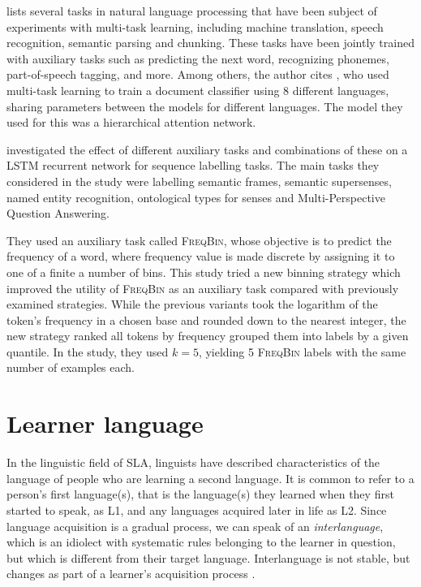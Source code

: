 \textcite{ruder17} lists several tasks in natural language processing that
have been subject of experiments with multi-task learning, including machine
translation, speech recognition, semantic parsing and chunking. These tasks
have been jointly trained with auxiliary tasks such as predicting the next
word, recognizing phonemes, part-of-speech tagging, and more. Among others,
the author cites \textcite{pappas17}, who used multi-task learning to train a
document classifier using 8 different languages, sharing parameters between
the models for different languages. The model they used for this was a
hierarchical attention network.

\textcite{alonso17} investigated the effect of different auxiliary tasks and
combinations of these on a \ac{LSTM} recurrent network for sequence labelling
tasks. The main tasks they considered in the study were labelling semantic
frames, semantic supersenses, named entity recognition, ontological types for
senses and Multi-Perspective Question Answering.

They used an auxiliary task called \textsc{FreqBin}, whose objective is to
predict the frequency of a word, where frequency value is made discrete by
assigning it to one of a finite a number of bins. This study tried a new
binning strategy which improved the utility of \textsc{FreqBin} as an
auxiliary task compared with previously examined strategies. While the
previous variants took the logarithm of the token's frequency in a chosen
base and rounded down to the nearest integer, the new strategy ranked all
tokens by frequency grouped them into labels by a given quantile. In the
study, they used $k=5$, yielding 5 \textsc{FreqBin} labels with the same
number of examples each.


\section{Learner language}

In the linguistic field of \ac{SLA}, linguists have described characteristics
of the language of people who are learning a second language. It is common to
refer to a person's first language(s), that is the language(s) they learned
when they first started to speak, as L1, and any languages acquired later in
life as L2. Since language acquisition is a gradual process, we can speak of
an \emph{interlanguage}, which is an idiolect with systematic rules belonging
to the learner in question, but which is different from their target
language. Interlanguage is not stable, but changes as part of a learner's
acquisition process \autocite[358]{myers-scotton}.

